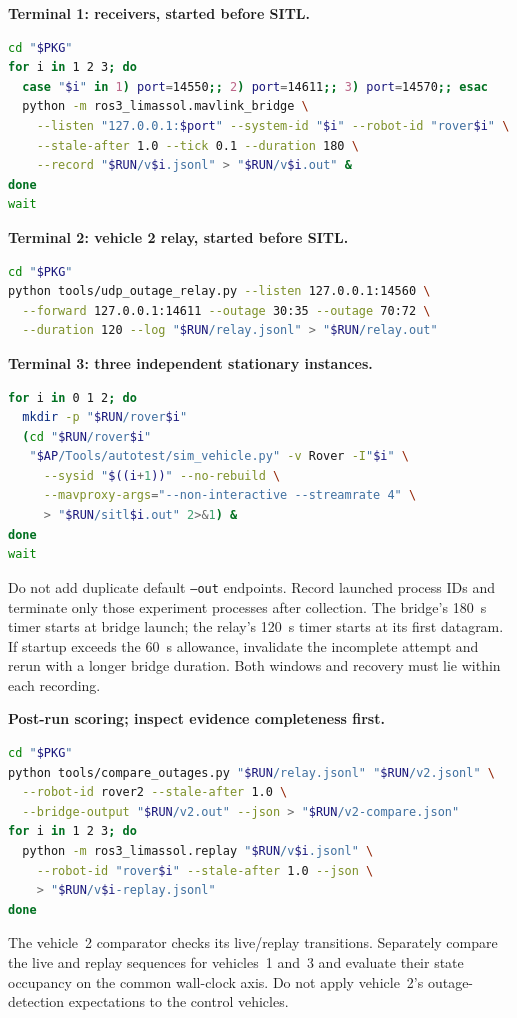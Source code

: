 \documentclass[10pt,a4paper]{article}
\begin{document}
\newpage
\textbf{Terminal 1: receivers, started before SITL.}
\begin{lstlisting}[language=bash]
cd "$PKG"
for i in 1 2 3; do
  case "$i" in 1) port=14550;; 2) port=14611;; 3) port=14570;; esac
  python -m ros3_limassol.mavlink_bridge \
    --listen "127.0.0.1:$port" --system-id "$i" --robot-id "rover$i" \
    --stale-after 1.0 --tick 0.1 --duration 180 \
    --record "$RUN/v$i.jsonl" > "$RUN/v$i.out" &
done
wait
\end{lstlisting}
\textbf{Terminal 2: vehicle 2 relay, started before SITL.}
\begin{lstlisting}[language=bash]
cd "$PKG"
python tools/udp_outage_relay.py --listen 127.0.0.1:14560 \
  --forward 127.0.0.1:14611 --outage 30:35 --outage 70:72 \
  --duration 120 --log "$RUN/relay.jsonl" > "$RUN/relay.out"
\end{lstlisting}
\textbf{Terminal 3: three independent stationary instances.}
\begin{lstlisting}[language=bash]
for i in 0 1 2; do
  mkdir -p "$RUN/rover$i"
  (cd "$RUN/rover$i"
   "$AP/Tools/autotest/sim_vehicle.py" -v Rover -I"$i" \
     --sysid "$((i+1))" --no-rebuild \
     --mavproxy-args="--non-interactive --streamrate 4" \
     > "$RUN/sitl$i.out" 2>&1) &
done
wait
\end{lstlisting}
Do not add duplicate default \texttt{--out} endpoints. Record launched
process IDs and terminate only those experiment processes after collection.
The bridge's 180~s timer starts at bridge launch; the relay's 120~s timer
starts at its first datagram. If startup exceeds the 60~s allowance,
invalidate the incomplete attempt and rerun with a longer bridge duration.
Both windows and recovery must lie within each recording.

\textbf{Post-run scoring; inspect evidence completeness first.}
\begin{lstlisting}[language=bash]
cd "$PKG"
python tools/compare_outages.py "$RUN/relay.jsonl" "$RUN/v2.jsonl" \
  --robot-id rover2 --stale-after 1.0 \
  --bridge-output "$RUN/v2.out" --json > "$RUN/v2-compare.json"
for i in 1 2 3; do
  python -m ros3_limassol.replay "$RUN/v$i.jsonl" \
    --robot-id "rover$i" --stale-after 1.0 --json \
    > "$RUN/v$i-replay.jsonl"
done
\end{lstlisting}
The vehicle~2 comparator checks its live/replay transitions. Separately
compare the live and replay sequences for vehicles~1 and~3 and evaluate
their state occupancy on the common wall-clock axis. Do not apply vehicle~2's
outage-detection expectations to the control vehicles.
\end{document}
